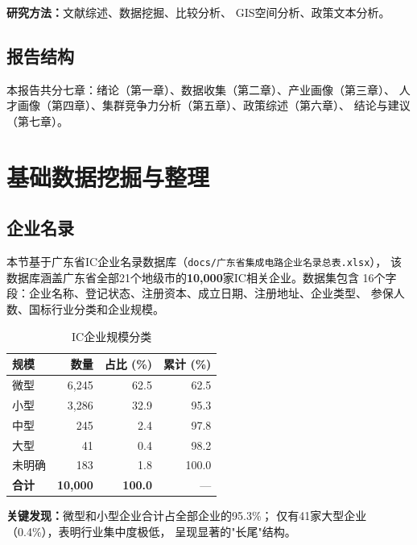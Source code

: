 \documentclass[12pt,a4paper]{article}
\newcommand{\tableHeaderRow}{\rowcolor{tealPrimary}\color{white}}
\newcommand{\tableOddRow}{\rowcolor{mintBG}}
\newcommand{\tableEvenRow}{\rowcolor{white}}
\begin{document}
\textbf{研究方法：}文献综述、数据挖掘、比较分析、
GIS空间分析、政策文本分析。

\subsection{报告结构}
\label{sec:structure}

本报告共分七章：绪论（第一章）、数据收集（第二章）、产业画像（第三章）、
人才画像（第四章）、集群竞争力分析（第五章）、政策综述（第六章）、
结论与建议（第七章）。

\section{基础数据挖掘与整理}
\label{sec:data}

\subsection{企业名录}
\label{sec:enterprises}

本节基于广东省IC企业名录数据库（\texttt{docs/广东省集成电路企业名录总表.xlsx}），
该数据库涵盖广东省全部21个地级市的\textbf{10,000}家IC相关企业。数据集包含
16个字段：企业名称、登记状态、注册资本、成立日期、注册地址、企业类型、
参保人数、国标行业分类和企业规模。

\begin{table}[H]
\centering
\caption{IC企业规模分类}
\label{tab:scale}
\begin{tabular}{lrrr}
\toprule
\tableHeaderRow
\textbf{规模} & \textbf{数量} & \textbf{占比 (\%)} & \textbf{累计 (\%)} \\
\midrule
\tableOddRow  微型     & 6,245 & 62.5 & 62.5 \\
\tableEvenRow 小型     & 3,286 & 32.9 & 95.3 \\
\tableOddRow  中型     & 245   & 2.4  & 97.8 \\
\tableEvenRow 大型     & 41    & 0.4  & 98.2 \\
\tableOddRow  未明确   & 183   & 1.8  & 100.0 \\
\midrule
\tableEvenRow \textbf{合计} & \textbf{10,000} & \textbf{100.0} & --- \\
\bottomrule
\end{tabular}
\end{table}

\textbf{关键发现：}微型和小型企业合计占全部企业的95.3\%；
仅有41家大型企业（0.4\%），表明行业集中度极低，
呈现显著的"长尾"结构。
\end{document}
